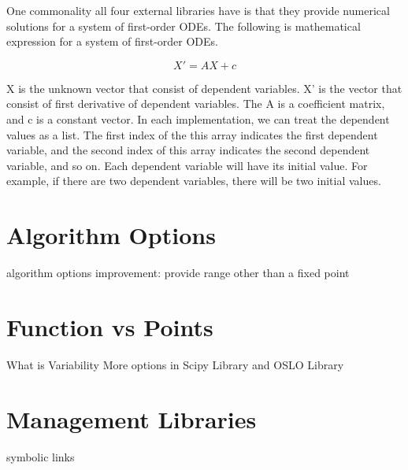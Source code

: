 One commonality all four external libraries have is that they provide numerical solutions for a system of first-order ODEs. The following is mathematical expression for a system of first-order ODEs. 

\begin{equation} \label{eq_foode}
    X' = AX + c
\end{equation}

X is the unknown vector that consist of dependent variables. X' is the vector that consist of first derivative of dependent variables. The A is a coefficient matrix, and c is a constant vector. In each implementation, we can treat the dependent values as a list. The first index of the this array indicates the first dependent variable, and the second index of this array indicates the second dependent variable, and so on. Each dependent variable will have its initial value. For example, if there are two dependent variables, there will be two initial values.

\section{Algorithm Options}
algorithm options
improvement: provide range other than a fixed point 

\section{Function vs Points}
What is Variability
More options in Scipy Library and OSLO Library

\section{Management Libraries}
symbolic links